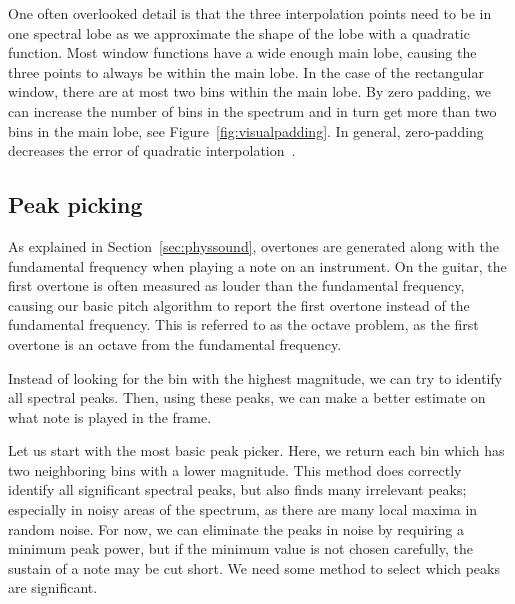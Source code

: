 \documentclass[a4paper,10pt,twocolumn]{article}
\begin{document}
One often overlooked detail is that the three interpolation points need to be in one spectral lobe as we approximate the shape of the lobe with a quadratic function. Most window functions have a wide enough main lobe, causing the three points to always be within the main lobe. In the case of the rectangular window, there are at most two bins within the main lobe. By zero padding, we can increase the number of bins in the spectrum and in turn get more than two bins in the main lobe, see Figure~\ref{fig:visualpadding}. In general, zero-padding decreases the error of quadratic interpolation~\cite{interpolnozero}.


\subsection{Peak picking}  \label{sub:pppeaakkk}
As explained in Section~\ref{sec:physsound}, overtones are generated along with the fundamental frequency when playing a note on an instrument. On the guitar, the first overtone is often measured as louder than the fundamental frequency, causing our basic pitch algorithm to report the first overtone instead of the fundamental frequency. This is referred to as the octave problem, as the first overtone is an octave from the fundamental frequency.

Instead of looking for the bin with the highest magnitude, we can try to identify all spectral peaks. Then, using these peaks, we can make a better estimate on what note is played in the frame.

Let us start with the most basic peak picker. Here, we return each bin which has two neighboring bins with a lower magnitude. This method does correctly identify all significant spectral peaks, but also finds many irrelevant peaks; especially in noisy areas of the spectrum, as there are many local maxima in random noise. For now, we can eliminate the peaks in noise by requiring a minimum peak power, but if the minimum value is not chosen carefully, the sustain of a note may be cut short. We need some method to select which peaks are significant.
\end{document}

